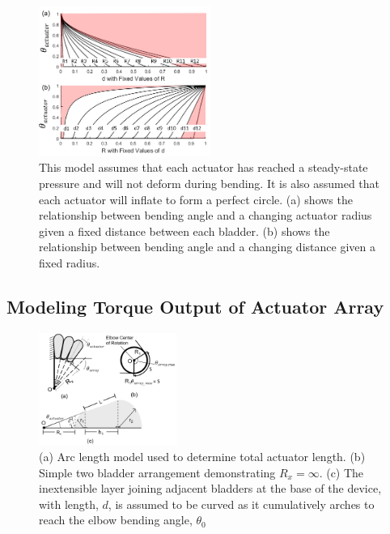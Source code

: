 \documentclass[letterpaper, 10 pt, conference]{ieeeconf}  %
\begin{document}
\begin{figure}
\centering
\includegraphics[width=0.5\textwidth]{graphs_model1.PNG}
\caption{This model assumes that each actuator has reached a steady-state pressure and will not deform during bending.  It is also assumed that each actuator will inflate to form a perfect circle.  (a) shows the relationship between bending angle and a changing actuator radius given a fixed distance between each bladder.  (b) shows the relationship between bending angle and a changing distance given a fixed radius.}
\label{fig:Graphs1}

\end{figure}	

\subsection{Modeling Torque Output of Actuator Array}



\begin{figure}[t!]
\centering
\includegraphics[width=0.4\textwidth]{model3.PNG}
\caption{(a) Arc length model used to determine total actuator length. (b) Simple two bladder arrangement demonstrating $R_x = \infty$. (c) The inextensible layer joining adjacent bladders at the base of the device, with length, $d$, is assumed to be curved as it cumulatively arches to reach the elbow bending angle, $\theta_0$ }
\label{fig:hotness}
\end{figure}
\end{document}
